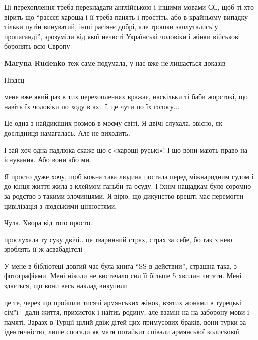 \begin{itemize}
Ці перехоплення треба перекладати англійською і іншими мовами ЄС, щоб ті хто
вірить що \enquote{рассєя хароша і її треба панять і простіть, або в крайньому випадку
тільки путін винуватий, інші расіянє добрі, але трошки заплутались у
пропаганді}, зрозуміли від якої нечисті Українські чоловіки і жінки військові
боронять всю Європу

\textbf{Maryna Rudenko} теж саме подумала, у нас вже не лишається доказів

Піздєц


мене вже який раз в тих перехопленнях вражає, наскільки ті баби жорстокі, що
навіть їх чоловіки по ходу в ах...ї, це чути по їх голосу...


Це одна з найдикіших розмов в моєму світі. Я двічі слухала, звісно, як
дослідниця намагалась. Але не виходить.


І зай хоч одна падлюка скаже що є «харощі руські»! І що вони мають право на
існування. Або вони або ми.


Я просто дуже хочу, щоб кожна така людина постала перед міжнародним судом і до
кінця життя жила з клеймом ганьби та осуду. І їхнім нащадкам було соромно за
родство з такими злочинцями. Я вірю, що дикунство врешті має перемогти
цивілізація з людськими цінностями.

Чула. Хвора від того просто.

прослухала ту суку двічі.. це тваринний страх, страх за себе, бо так з нею зроблять її ж асвабадітєлі


У мене в бібліотеці довгий час була книга \enquote{SS в действии}, страшна така, з
фотографіями. Мені ніколи не вистачало сил її більше 5 хвилин читати. Мені
здається, що вони весь наклад викупили


це те, через що пройшли тисячі армянських жінок, взятих жонами в турецькі сім"ї
- дали життя, прихисток і наітиь родину, але взамін на на заборону мови і
памяті. Заразх в Турції цілий двіж дітей цих примусових браків, вони турки за
ідентичністю, лише спогади як мати потайкит співали армянської колискової



\end{itemize}
